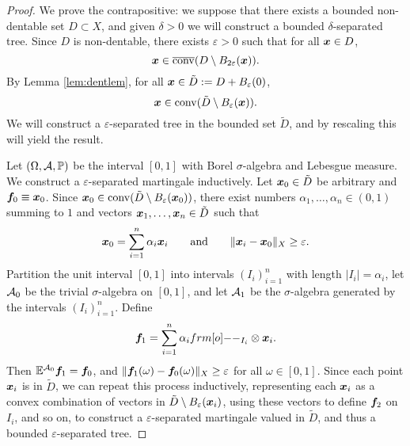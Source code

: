 \begin{proof}
  We prove the contrapositive: we suppose that there exists a bounded non-dentable set $D \subset X$, and given $\delta > 0$ we will construct a bounded $\delta$-separated tree.
  Since $D$ is non-dentable, there exists $\varepsilon > 0$ such that for all $\bm{x} \in D$,
  \begin{equation*}
    \bm{x} \in \overline{\mathrm{conv}}(D \setminus B_{2\varepsilon}(\bm{x})).
  \end{equation*}
  By Lemma \ref{lem:dentlem}, for all $\bm{x} \in \tilde{D} := D + B_{\varepsilon}(0)$,
  \begin{equation*}
    \bm{x} \in \mathrm{conv}(\tilde{D} \setminus B_{\varepsilon}(\bm{x})).
  \end{equation*}
  We will construct a $\varepsilon$-separated tree in the bounded set $\tilde{D}$, and by rescaling this will yield the result.

  Let $(\Omega,\mathcal{A},\mathbb{P})$ be the interval $[0,1]$ with Borel $\sigma$-algebra and Lebesgue measure.
  We construct a $\varepsilon$-separated martingale inductively.
  Let $\bm{x}_{0} \in \tilde{D}$ be arbitrary and $\bm{f}_0 \equiv \bm{x}_0$.
  Since $\bm{x}_0 \in \mathrm{conv}(\tilde{D} \setminus B_{\varepsilon}(\bm{x}_0))$, there exist numbers $\alpha_1,\ldots, \alpha_n \in (0,1)$ summing to $1$ and vectors $\bm{x}_{1}, \ldots, \bm{x}_{n} \in \tilde{D}$ such that
  \begin{equation*}
    \bm{x}_0 = \sum_{i=1}^{n} \alpha_{i} \bm{x}_{i} \qquad \text{and} \qquad \|\bm{x}_{i} - \bm{x}_{0}\|_X \geq \varepsilon.
  \end{equation*}
  Partition the unit interval $[0,1]$ into intervals $(I_i)_{i=1}^{n}$ with length $|I_{i}| = \alpha_{i}$, let $\mathcal{A}_{0}$ be the trivial $\sigma$-algebra on $[0,1]$, and let $\mathcal{A}_{1}$ be the $\sigma$-algebra generated by the intervals $(I_i)_{i=1}^{n}$.
  Define
  \begin{equation*}
    \mb{f}_1 = \sum_{i=1}^{n} \alpha_i \1_{I_i} \otimes \mb{x}_{i}.
  \end{equation*}
  Then $\mathbb{E}^{\mathcal{A}_0} \bm{f}_1 = \bm{f}_0$, and $\|\bm{f}_1(\omega) - \bm{f}_0(\omega)\|_{X} \geq \varepsilon$ for all $\omega \in [0,1]$.
  Since each point $\bm{x}_{i}$ is in $\tilde{D}$, we can repeat this process inductively, representing each $\bm{x}_{i}$ as a convex combination of vectors in $\tilde{D} \setminus B_{\varepsilon}(\bm{x}_i)$, using these vectors to define $\bm{f}_2$ on $I_{i}$, and so on, to construct a $\varepsilon$-separated martingale valued in $\tilde{D}$, and thus a bounded $\varepsilon$-separated tree.
\end{proof}

